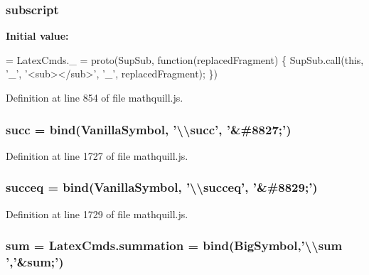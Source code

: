 \subsubsection[{subscript}]{ subscript}\label{mathquill_8js_a7033a4368ff882fb4a1f3724fb1b8e24}
{\bfseries Initial value\-:}
\begin{DoxyCode}
= LatexCmds.\_ = proto(SupSub, \textcolor{keyword}{function}(replacedFragment) \{
  SupSub.call(\textcolor{keyword}{this}, \textcolor{charliteral}{'\_'}, \textcolor{stringliteral}{'<sub></sub>'}, \textcolor{charliteral}{'\_'}, replacedFragment);
\})
\end{DoxyCode}


Definition at line 854 of file mathquill.\-js.

\subsubsection[{succ}]{ succ = {\bf bind}({\bf Vanilla\-Symbol}, '\textbackslash{}\textbackslash{}succ', '\&\#8827;')}\label{mathquill_8js_a97a73b5a18201b32fb129052ba5199e2}


Definition at line 1727 of file mathquill.\-js.

\subsubsection[{succeq}]{ succeq = {\bf bind}({\bf Vanilla\-Symbol}, '\textbackslash{}\textbackslash{}succeq', '\&\#8829;')}\label{mathquill_8js_acb8e3f38a7c0f1cf33571e6105103fce}


Definition at line 1729 of file mathquill.\-js.

\subsubsection[{sum}]{ sum = Latex\-Cmds.\-summation = {\bf bind}({\bf Big\-Symbol},'\textbackslash{}\textbackslash{}sum ','\&sum;')}\label{mathquill_8js_a61c1602509cc9370d4803aadfd4b91ed}


